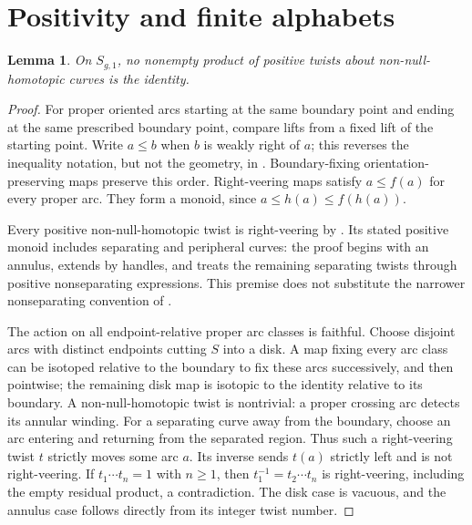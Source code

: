 \documentclass[11pt]{article}
\newtheorem{lemma}[theorem]{Lemma}
\begin{document}
\section{Positivity and finite alphabets}
\begin{lemma}\label{lem:positive}
On $S_{g,1}$, no nonempty product of positive twists about non-null-homotopic curves is the identity.
\end{lemma}
\begin{proof}
For proper oriented arcs starting at the same boundary point and ending at the same prescribed boundary point, compare lifts from a fixed lift of the starting point. Write $a\leq b$ when $b$ is weakly right of $a$; this reverses the inequality notation, but not the geometry, in \cite[Definition 2.1]{HKM}. Boundary-fixing orientation-preserving maps preserve this order. Right-veering maps satisfy $a\leq f(a)$ for every proper arc. They form a monoid, since $a\leq h(a)\leq f(h(a))$.

Every positive non-null-homotopic twist is right-veering by \cite[Lemma 2.5]{HKM}. Its stated positive monoid includes separating and peripheral curves: the proof begins with an annulus, extends by handles, and treats the remaining separating twists through positive nonseparating expressions. This premise does not substitute the narrower nonseparating convention of \cite{BMVHM}.

The action on all endpoint-relative proper arc classes is faithful. Choose disjoint arcs with distinct endpoints cutting $S$ into a disk. A map fixing every arc class can be isotoped relative to the boundary to fix these arcs successively, and then pointwise; the remaining disk map is isotopic to the identity relative to its boundary. A non-null-homotopic twist is nontrivial: a proper crossing arc detects its annular winding. For a separating curve away from the boundary, choose an arc entering and returning from the separated region. Thus such a right-veering twist $t$ strictly moves some arc $a$. Its inverse sends $t(a)$ strictly left and is not right-veering. If $t_1\cdots t_n=1$ with $n\geq1$, then $t_1^{-1}=t_2\cdots t_n$ is right-veering, including the empty residual product, a contradiction. The disk case is vacuous, and the annulus case follows directly from its integer twist number.
\end{proof}
\end{document}
